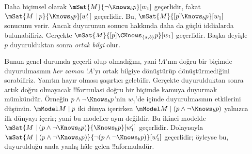 \documentclass[../../../include/open-logic-section]{subfiles}
\begin{document}
Daha biçimsel olarak $\mSat{M}{\lnot \Knows_b p}[w_1]$ geçerlidir, fakat
$\mSat{M \mid p}{\Knows_b p}[w'_1]$ geçerlidir. Bu, $\mSat{M}{[p] \Knows_b
p}[w_1]$ sonucunu verir. Ancak duyurunun sonucu hakkında daha da güçlü
iddialarda bulunabiliriz. Gerçekte $\mSat{M}{[p]\CKnows_{\{a,b\}} p}[w_1]$
geçerlidir. Başka deyişle $p$ duyurulduktan sonra \emph{ortak bilgi} olur.

Bunun genel durumda geçerli olup olmadığını, yani $!A$'nın doğru bir biçimde
duyurulmasının \emph{her zaman} $!A$'yı ortak bilgiye dönüştürüp
dönüştürmediğini sorabiliriz. Yanıtın hayır olması şaşırtıcı gelebilir.
Gerçekte duyurulduktan sonra artık doğru olmayacak !!{formula}s{}i doğru bir
biçimde kamuya duyurmak mümkündür. Örneğin $p \land \lnot \Knows_b p$'nin
$w_1$'de  içinde duyurulmasının etkilerini
düşünün. $\mModel M \mid p$ iki dünya içerirken
$\mModel M \mid (p \land \lnot \Knows_b p)$ yalnızca ilk dünyayı içerir;
yani bu modeller aynı değildir. Bu ikinci modelde
$\mSat{M \mid (p \land \lnot \Knows_b p)}{\Knows_b p}[w'_1]$ geçerlidir.
Dolayısıyla
$\mSat{M \mid (p \land \lnot \Knows_b p)}{\lnot (p \land \lnot \Knows_b
p)}[w'_1]$ geçerlidir; öyleyse bu, duyurulduğu anda yanlış hâle gelen
!!a{formula}{}dür.
\end{document}
